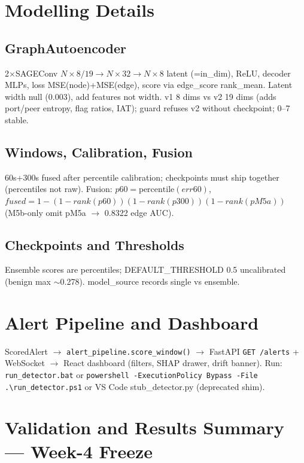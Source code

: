\documentclass[12pt,a4paper,oneside]{report}
\begin{document}
\section{Modelling Details}
\subsection{GraphAutoencoder}
2$\times$SAGEConv $N\times8/19\rightarrow N\times32\rightarrow N\times8$ latent (=in\_dim), ReLU, decoder MLPs, loss MSE(node)+MSE(edge), score via edge\_score rank\_mean. Latent width null (0.003), add features not width. v1 8 dims vs v2 19 dims (adds port/peer entropy, flag ratios, IAT); guard refuses v2 without checkpoint; 0--7 stable.

\subsection{Windows, Calibration, Fusion}
60s+300s fused after percentile calibration; checkpoints must ship together (percentiles not raw). Fusion: $p60=\text{percentile}(err60)$, $fused=1-(1-rank(p60))(1-rank(p300))(1-rank(pM5a))$ (M5b-only omit pM5a $\rightarrow$ 0.8322 edge AUC).

\subsection{Checkpoints and Thresholds}
Ensemble scores are percentiles; DEFAULT\_THRESHOLD 0.5 uncalibrated (benign max $\sim$0.278). model\_source records single vs ensemble.

\section{Alert Pipeline and Dashboard}
ScoredAlert $\rightarrow$ \texttt{alert\_pipeline.score\_window()} $\rightarrow$ FastAPI \texttt{GET /alerts} + WebSocket $\rightarrow$ React dashboard (filters, SHAP drawer, drift banner). Run: \texttt{run\_detector.bat} or \texttt{powershell -ExecutionPolicy Bypass -File .\textbackslash run\_detector.ps1} or VS Code stub\_detector.py (deprecated shim).

\section{Validation and Results Summary — Week-4 Freeze}
\end{document}
